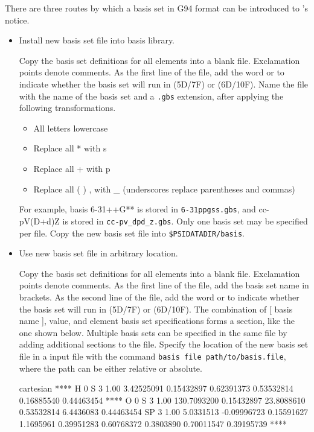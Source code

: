 There are three routes by which a basis set in G94 format can be introduced to \PSIfour's notice.

\begin{itemize}

\item Install new basis set file into \PSIfour basis library.

Copy the basis set definitions for all elements into a blank file. Exclamation points denote comments.
As the first line of the file, add the word  or  to indicate
whether the basis set will run in (5D/7F) or (6D/10F).
Name the file with the name of the basis set and a \texttt{.gbs} extension, after applying the following transformations.
\begin{itemize}
\item[] All letters lowercase
\item[] Replace all * with s
\item[] Replace all + with p
\item[] Replace all ( ) , with \_ \quad (underscores replace parentheses and commas)
\end{itemize}
For example, basis 6-31++G** is stored in \texttt{6-31ppgss.gbs}, and cc-pV(D+d)Z is stored in \texttt{cc-pv\_dpd\_z.gbs}.
Only one basis set may be specified per file.
Copy the new basis set file into \texttt{\$PSIDATADIR/basis}.

\item Use new basis set file in arbitrary location.

Copy the basis set definitions for all elements into a blank file. Exclamation points denote comments.
As the first line of the file, add the basis set name in brackets.
As the second line of the file, add the word  or  to indicate
whether the basis set will run in (5D/7F) or (6D/10F). 
The combination of [ basis name ],  value, and element basis set specifications 
forms a section, like the one shown below.
Multiple basis sets can be specified in the same file by adding additional sections to the file.
Specify the location of the new basis set file in a \PSIfour input file with the command 
\texttt{basis file path/to/basis.file}, where the path can be either relative or absolute.
\begin{Snippet}
[ sto-3g ]
cartesian
****
H     0 
S   3   1.00
      3.42525091             0.15432897       
      0.62391373             0.53532814       
      0.16885540             0.44463454       
****
O     0 
S   3   1.00
    130.7093200              0.15432897       
     23.8088610              0.53532814       
      6.4436083              0.44463454       
SP   3   1.00
      5.0331513             -0.09996723             0.15591627       
      1.1695961              0.39951283             0.60768372       
      0.3803890              0.70011547             0.39195739       
****
\end{Snippet}


\end{itemize}
